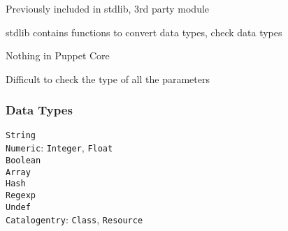 
\begin{iframe}
\item Previously included in stdlib, 3rd party module
\item stdlib contains functions to convert data types, check data types
\item Nothing in Puppet Core
\item Difficult to check the type of all the parameters
\end{iframe}
 \begin{frame}
     \frametitle{Data Types}
     \begin{center}
         \LARGE{\texttt{String}}\pause\\
         \LARGE{\texttt{Numeric}: \texttt{Integer}, \texttt{Float}}\pause\\
         \LARGE{\texttt{Boolean}}\pause\\
         \LARGE{\texttt{Array}}\pause\\
         \LARGE{\texttt{Hash}}\pause\\
         \LARGE{\texttt{Regexp}}\pause\\
         \LARGE{\texttt{Undef}}\pause\\
         \LARGE{\texttt{Catalogentry}: \texttt{Class}, \texttt{Resource}}
    \end{center}
\end{frame}

